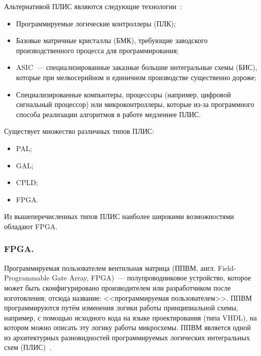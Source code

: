 Альтернативой ПЛИС являются следующие технологии~\cite{Wiki_PLD}:
\begin{itemize}
	\item Программируемые логические контроллеры (ПЛК);
	\item Базовые матричные кристаллы (БМК), требующие заводского производственного процесса для программирования;
	\item ASIC~--- специализированные заказные большие интегральные схемы (БИС), которые при мелкосерийном и единичном производстве существенно дороже;
	\item Специализированные компьютеры, процессоры (например, цифровой сигнальный процессор) или микроконтроллеры, которые из-за программного способа реализации алгоритмов в работе медленнее ПЛИС.
\end{itemize}

Существует множество различных типов ПЛИС:
\begin{itemize}
	\item PAL;
	\item GAL;
	\item CPLD;
	\item FPGA.
\end{itemize}

Из вышеперечисленных типов ПЛИС наиболее широкими возможностями обладают FPGA.

\subsubsection{FPGA. }
\label{section:FPGA}
Программируемая пользователем вентильная матрица (ППВМ, англ. \foreignlanguage{english}{Field-Programmable Gate Array, FPGA})~--- полупроводниковое устройство, которое может быть сконфигурировано производителем или разработчиком после изготовления; отсюда название: <<программируемая пользователем>>. ППВМ программируются путём изменения логики работы принципиальной схемы, например, с помощью исходного кода на языке проектирования (типа VHDL), на котором можно описать эту логику работы микросхемы. ППВМ является одной из архитектурных разновидностей программируемых логических интегральных схем (ПЛИС)~\cite{Wiki_FPGA}.

